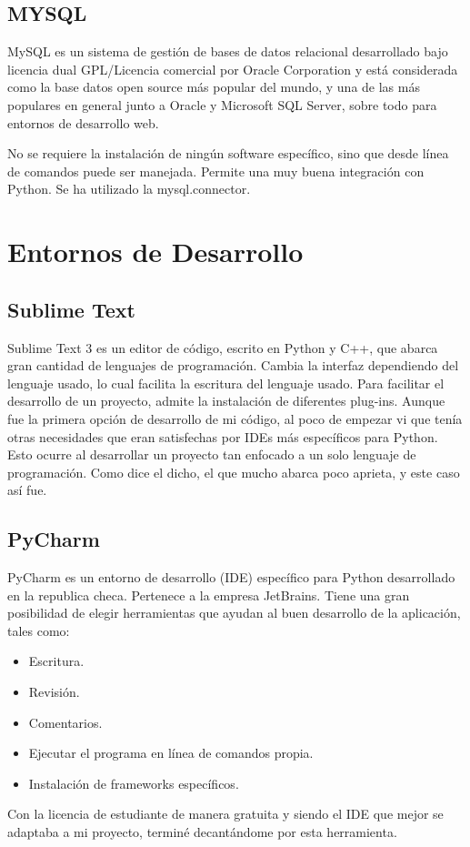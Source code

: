 
\subsection{MYSQL}
MySQL es un sistema de gestión de bases de datos relacional desarrollado bajo licencia dual GPL/Licencia comercial por Oracle Corporation y está considerada como la base datos open source más popular del mundo, y una de las más populares en general junto a Oracle y Microsoft SQL Server, sobre todo para entornos de desarrollo web. \cite{mysql}

No se requiere la instalación de ningún software específico, sino que desde línea de comandos puede ser manejada.
Permite una muy buena integración con Python. Se ha utilizado la mysql.connector.

\section{Entornos de Desarrollo}
\subsection{Sublime Text}
Sublime Text 3 es un editor de código, escrito en Python y C++, que abarca gran cantidad de lenguajes de programación. Cambia la interfaz dependiendo del lenguaje usado, lo cual facilita la escritura del lenguaje usado.
Para facilitar el desarrollo de un proyecto, admite la instalación de diferentes plug-ins.
Aunque fue la primera opción de desarrollo de mi código, al poco de empezar vi que tenía otras necesidades que eran satisfechas por IDEs más específicos para Python. Esto ocurre al desarrollar un proyecto tan enfocado a un solo lenguaje de programación. Como dice el dicho, el que mucho abarca poco aprieta, y este caso así fue.
\subsection{PyCharm}
PyCharm es un entorno de desarrollo (IDE) específico para Python desarrollado en la republica checa. Pertenece a la empresa JetBrains. 
Tiene una gran posibilidad de elegir herramientas que ayudan al buen desarrollo de la aplicación, tales como:
\begin{itemize}
    \item Escritura.
    \item Revisión.
    \item Comentarios.
    \item Ejecutar el programa en línea de comandos propia.
    \item Instalación de frameworks específicos.
\end{itemize}
Con la licencia de estudiante de manera gratuita y siendo el IDE que mejor se adaptaba a mi proyecto, terminé decantándome por esta herramienta.
